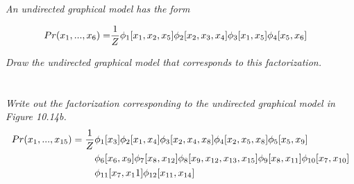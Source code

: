 \documentclass[11pt]{report}
\begin{document}
\section{}
\textit{An undirected graphical model has the form}

\begin{equation} 
\begin{aligned}
Pr(x_1, ..., x_{6}) = & \frac{1}{Z} \phi_1[x_1, x_2, x_5] \phi_2[x_2, x_3, x_4] \phi_3[x_1, x_5] \phi_4[x_5, x_6] \notag
\end{aligned} 
\end{equation}

\textit{Draw the undirected graphical model that corresponds to this factorization.}

\begin{figure}[h]
\end{figure}

\section{}
\textit{Write out the factorization corresponding to the undirected graphical model in Figure 10.14b.}
\begin{equation} 
\begin{aligned}
Pr(x_1, ..., x_{15}) = \frac{1}{Z} &\phi_1[x_3] \phi_2[x_1, x_4] \phi_3[x_2, x_4, x_8] \phi_4[x_2, x_5, x_8] \phi_5[x_5, x_9] \\
  & \phi_6[x_6, x_9] \phi_7[x_8, x_{12}] \phi_8[x_9, x_{12}, x_{13}, x_{15}] \phi_9[x_8, x_{11}] \phi_{10}[x_7, x_{10}] \\
  & \phi_{11}[x_7, x_11] \phi_{12}[x_{11}, x_{14}] \notag
\end{aligned} 
\end{equation}
\FloatBarrier
\end{document}
